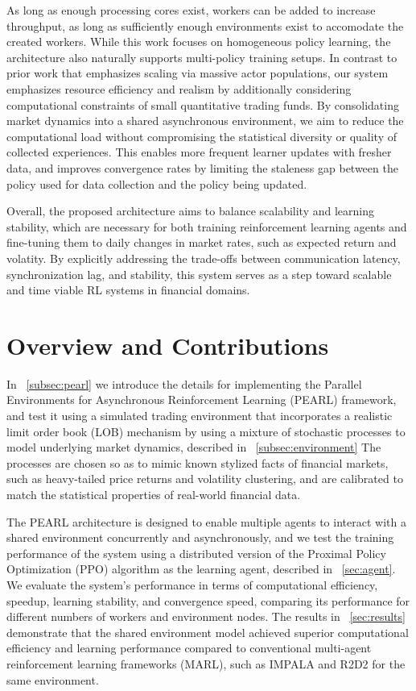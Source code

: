 As long as enough processing cores exist, workers can be added to increase throughput, as long
as sufficiently enough environments exist to accomodate the created workers.
While this work focuses on homogeneous policy learning, the architecture also naturally supports multi-policy training setups.
In contrast to prior work that emphasizes scaling via massive actor populations,
our system emphasizes resource efficiency and realism by additionally considering computational constraints of small quantitative trading funds.
By consolidating market dynamics into a shared asynchronous environment,
we aim to reduce the computational load without compromising the statistical diversity or quality of collected experiences.
This enables more frequent learner updates with fresher data, and improves convergence rates by limiting the staleness gap
between the policy used for data collection and the policy being updated.

Overall, the proposed architecture aims to balance scalability and learning stability,
which are necessary for both training reinforcement learning agents and fine-tuning them to daily changes
in market rates, such as expected return and volatity.
By explicitly addressing the trade-offs between communication latency, synchronization lag, and stability,
this system serves as a step toward scalable and time viable RL systems in financial domains.

\section{Overview and Contributions}
\label{sec:overview}

In ~\autoref{subsec:pearl} we introduce the details for implementing the Parallel Environments for Asynchronous Reinforcement Learning (PEARL) framework,
and test it using a simulated trading environment that incorporates a realistic limit order book (LOB) mechanism
by using a mixture of stochastic processes to model underlying market dynamics, described in ~\autoref{subsec:environment}
The processes are chosen so as to mimic known stylized facts of financial markets, such as heavy-tailed price returns and
volatility clustering, and are calibrated to match the statistical properties of real-world financial data.

The PEARL architecture is designed to enable multiple agents to interact with a shared environment concurrently and asynchronously,
and we test the training performance of the system using a distributed version of the Proximal Policy Optimization (PPO) algorithm
as the learning agent, described in ~\autoref{sec:agent}.
We evaluate the system's performance in terms of computational efficiency, speedup, learning stability, and convergence speed,
comparing its performance for different numbers of workers and environment nodes.
The results in ~\autoref{sec:results} demonstrate that the shared environment model
achieved superior computational efficiency and learning performance compared to
conventional multi-agent reinforcement learning frameworks (MARL), such as IMPALA and R2D2 for the same environment.
